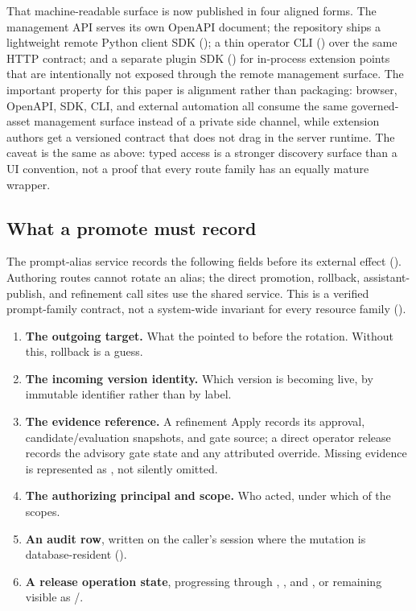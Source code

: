 That machine-readable surface is now published in four aligned forms. The
management API serves its own OpenAPI document; the repository ships a lightweight
remote Python client SDK (); a thin operator CLI
() over the same HTTP contract; and a separate plugin SDK
() for in-process extension points that are intentionally
not exposed through the remote management surface. The important property for this
paper is alignment rather than packaging: browser, OpenAPI, SDK, CLI, and external
automation all consume the same governed-asset management surface instead of a
private side channel, while extension authors get a versioned contract that does
not drag in the server runtime. The caveat is the same as above: typed access is a
stronger discovery surface than a UI convention, not a proof that every route
family has an equally mature wrapper.

\subsection{What a promote must record}

The prompt-alias service records the following fields before its external effect
(). Authoring routes cannot rotate an alias; the direct
promotion, rollback, assistant-publish, and refinement  call sites use
the shared service. This is a verified prompt-family contract, not a system-wide
invariant for every resource family ().

\begin{enumerate}[leftmargin=1.5em]
\item \textbf{The outgoing target.} What the \livetarget{} pointed to before the
      rotation. Without this, rollback is a guess.
\item \textbf{The incoming version identity.} Which version is becoming live, by
      immutable identifier rather than by label.
\item \textbf{The evidence reference.} A refinement Apply records its approval,
      candidate/evaluation snapshots, and gate source; a direct operator release
      records the advisory gate state and any attributed override. Missing evidence
      is represented as , not silently omitted.
\item \textbf{The authorizing principal and scope.} Who acted, under which of the
      \statScopesW{} scopes.
\item \textbf{An audit row}, written on the caller's session where the mutation is
      database-resident ().
\item \textbf{A release operation state}, progressing through
      , , and , or remaining visible
      as /.
\end{enumerate}

